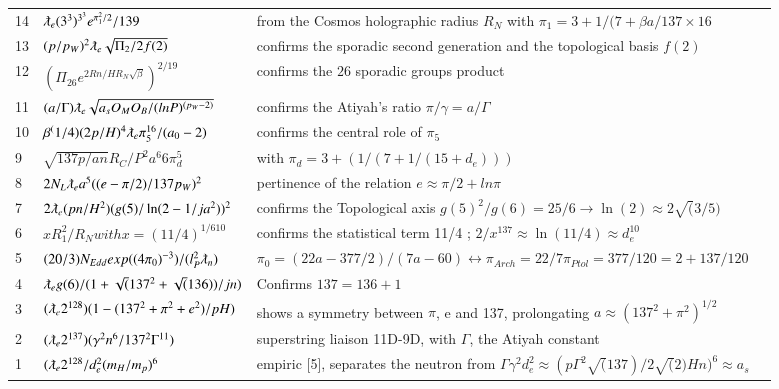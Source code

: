 \documentclass[a4paper,9pt]{article}
\begin{document}
\begin{appendix}
\begin{table}
\begin{tabular}{llll}
     14 & $ \lambdabar_{e} (3^3)^{3^3} e^{\pi_1^2/2}/139  $ & from the Cosmos holographic radius $R_N$ with $\pi_1 = 3+1/(7 + \beta a/137\times 16$  \\
     13 & $ (p/p_W)^2 \lambdabar_{e} \sqrt{\Pi_2/2f(2)}  $ & confirms the sporadic second generation and the topological basis $f(2)$ \\
     12 & $  (   \Pi_{26}e^   {2Rn/HR_N\sqrt{\beta}   }     )^{2/19}  $ & confirms the $26$ sporadic groups product  \\       
     11 & $ (a/\Gamma) \lambdabar_{e} \sqrt{a_s O_M O_B/(lnP)^{(p_W-2)}}  $ & confirms the Atiyah's ratio $\pi/\gamma = a/\Gamma$  \\    
     10 & $ \beta ^(1/4) (2p/H)^4 \lambdabar_{e} \pi_5^{16}/(a_0 - 2) $   & confirms the central role of $\pi_5$ \\
    
      9 & $ \sqrt{137p/an} R_C/P^2 a^6 6\pi_d^5 $   & with $\pi_d = 3 + (1/(7+1/(15 + d_e)))$  \\           
      8 & $2 N_L\lambdabar_{e} a^5((e-\pi/2)/137p_W)^2$   & pertinence of the relation $e \approx \pi/2 + ln\pi$  \\       
      7 & $2\lambdabar_{e} (pn/H^{2})(g(5)/\ln(2-1/ja^2))^2$   & confirms the Topological axis $g(5)^2/g(6) = 25/6 \rightarrow \ln(2) \approx 2\sqrt(3/5)$  \\    
      6 & $xR_1^2/R_N with x = (11/4)^{1/610}$ &  confirms the statistical term 11/4 ; $2/x^{137} \approx \ln(11/4) \approx d_e^{10}$ \\    
      5 & $(20/3)N_{Edd} exp((4 \pi_0)^{-3})/(l_P^2\lambdabar_n)$ & $\pi_0 =  (22a - 377/2)/(7a - 60) \leftrightarrow \pi_{Arch} = 22/7  \pi_{Ptol} = 377/120 = 2 + 137/120$  \\    
      4 & $\lambdabar_{e} g(6)/(1+\sqrt(137^2+\sqrt(136))/jn)$  & Confirms $137=136+1$ \\
      3 & $(\lambdabar_{e} 2^{128})(1-(137^2+\pi^2+e^2)/pH)$ & shows a symmetry between $\pi$, e and 137, prolongating $ a \approx (137^2 + \pi^2)^{1/2}$ \\
      2 & $(\lambdabar_{e} 2^{137})(\gamma^2 n^6 / 137^2 \Gamma^{11})$ & superstring liaison 11D-9D, with $\Gamma$, the Atiyah constant \\
      1 & $(\lambdabar_{e} 2^{128}/d_e^2(m_H/m_p)^6$  & empiric [5], separates the neutron from $\Gamma \gamma^2 d_e^2 \approx (p\Gamma^2 \sqrt(137)/2 \sqrt(2) Hn)^6 \approx a_s$ \\
    

\end{tabular}
\end{table}
\end{appendix}
\end{document}
